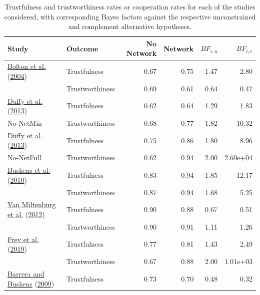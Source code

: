 \documentclass[
  11pt,
]{article}
\begin{document}
\renewcommand{\floatpagefraction}{.8}

\begin{table}

\caption{\label{tab:desc-table}Trustfulness and trustworthiness rates or cooperation rates for each of the studies considered, with corresponding Bayes factors against the respective unconstrained and complement alternative hypotheses.}
\centering
\begin{tabular}[t]{llrrrr}
\toprule
Study & Outcome & No Network & Network & $BF_{i,u}$ & $BF_{i,c}$\\
\midrule
\protect\hyperlink{ref-bolton_electronic_2004}{Bolton et al.} (\protect\hyperlink{ref-bolton_electronic_2004}{2004}) & Trustfulness & 0.67 & 0.75 & 1.47 & 2.80\\
\addlinespace
 & Trustworthiness & 0.69 & 0.61 & 0.64 & 0.47\\
\addlinespace
\protect\hyperlink{ref-duffy2013social}{Duffy et al.} (\protect\hyperlink{ref-duffy2013social}{2013}) & Trustfulness & 0.62 & 0.64 & 1.29 & 1.83\\
\addlinespace
No-NetMin & Trustworthiness & 0.68 & 0.77 & 1.82 & 10.32\\
\addlinespace
\protect\hyperlink{ref-duffy2013social}{Duffy et al.} (\protect\hyperlink{ref-duffy2013social}{2013}) & Trustfulness & 0.75 & 0.86 & 1.80 & 8.96\\
\addlinespace
No-NetFull & Trustworthiness & 0.62 & 0.94 & 2.00 & 2.60e+04\\
\addlinespace
\protect\hyperlink{ref-buskens_raub_veer_triads_2010}{Buskens et al.} (\protect\hyperlink{ref-buskens_raub_veer_triads_2010}{2010}) & Trustfulness & 0.83 & 0.94 & 1.85 & 12.17\\
\addlinespace
 & Trustworthiness & 0.87 & 0.94 & 1.68 & 5.25\\
\addlinespace
\protect\hyperlink{ref-miltenburg_buskens_triads_2012}{Van Miltenburg et al.} (\protect\hyperlink{ref-miltenburg_buskens_triads_2012}{2012}) & Trustfulness & 0.90 & 0.88 & 0.67 & 0.51\\
\addlinespace
 & Trustworthiness & 0.90 & 0.91 & 1.11 & 1.26\\
\addlinespace
\protect\hyperlink{ref-frey_buskens_investments_2019}{Frey et al.} (\protect\hyperlink{ref-frey_buskens_investments_2019}{2019}) & Trustfulness & 0.77 & 0.81 & 1.43 & 2.49\\
\addlinespace
 & Trustworthiness & 0.67 & 0.88 & 2.00 & 1.01e+03\\
\addlinespace
\protect\hyperlink{ref-barrera_buskens_third_2009}{Barrera and Buskens} (\protect\hyperlink{ref-barrera_buskens_third_2009}{2009}) & Trustfulness & 0.73 & 0.70 & 0.48 & 0.32\\

\end{tabular}
\end{table}
\end{document}

